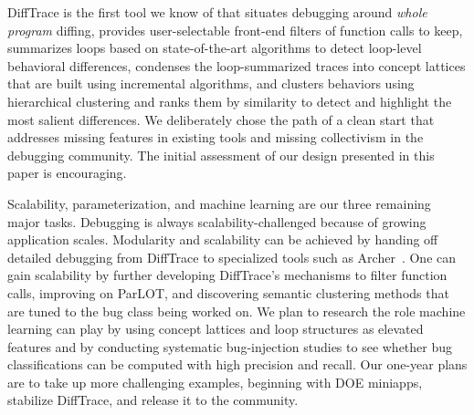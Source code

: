 DiffTrace is the first tool we know of that situates debugging around {\em whole program}
diffing, provides user-selectable front-end filters of function calls to keep,
summarizes loops based on state-of-the-art algorithms to detect loop-level
behavioral differences,
condenses the loop-summarized
traces into concept lattices that are built using incremental
algorithms, and clusters behaviors using hierarchical clustering and ranks them by similarity to detect and highlight the most salient differences.
%
We deliberately chose the path of a clean start that addresses missing features
in existing tools and missing collectivism in the debugging community.
%
The initial assessment of our design presented in this paper is encouraging.


Scalability, parameterization, and machine learning are our three remaining major tasks.
%
Debugging is always scalability-challenged because of growing application scales.
%
Modularity and scalability can be achieved by handing off detailed debugging from
DiffTrace to specialized tools such as Archer~\cite{archer}.
%
One can gain scalability by further developing DiffTrace's mechanisms to filter function
calls, improving on ParLOT, and discovering semantic clustering
methods that are tuned to the bug class being worked on.
%
We plan to research the role machine learning can play by using concept lattices
and loop structures as elevated features and by conducting systematic bug-injection
studies to see whether bug classifications can be computed with high precision
and recall.
%
Our one-year plans are to take up more challenging examples, beginning with DOE miniapps, stabilize DiffTrace, and release it to the community.
 

